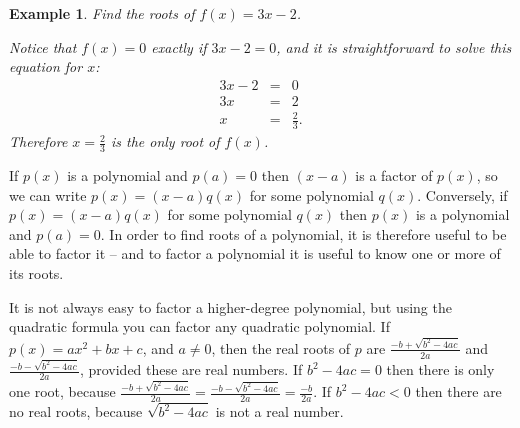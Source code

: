 \documentclass[11pt]{book}               %
\newtheorem{example}{Example}
\begin{document}
\begin{example} Find the roots of $ f(x) = 3x -2 $.

\normalfont
Notice that $f(x)=0$ exactly if $3x-2=0$, and it is straightforward to solve this equation for $x$: 
    \[
    \begin{array}{rcl}
    3x-2 & = & 0\\
    3x  & = & 2\\
    x   & = &  \frac{2}{3} .
    \end{array}
    \]
    Therefore $x = \frac{2}{3}$ is the only root of $f(x)$.
\end{example}


If $p(x)$ is a polynomial and $p(a)=0$ then $(x-a)$ is a factor of $p(x)$, so we can write $p(x) = (x-a)q(x)$ for some polynomial $q(x)$.
Conversely, if $p(x)=(x-a)q(x)$ for some polynomial $q(x)$ then $p(x)$ is a polynomial and $p(a)=0$.
 In order to find roots of a polynomial, it is therefore useful to be able to factor it -- and to factor a polynomial it is useful to know one or more of its roots.


It is not always easy to factor a higher-degree polynomial, but using the quadratic formula you can factor any quadratic polynomial. 
If $p(x) = ax^2 + bx + c$, and $a \neq 0$,  then the real roots of $p$ are $\frac{-b + \sqrt{b^2-4ac}}{2a}$ and $\frac{-b - \sqrt{b^2-4ac}}{2a}$, provided these are real numbers. 
If $b^2-4ac=0$ then there is only one root, because $\frac{-b + \sqrt{b^2-4ac}}{2a}=\frac{-b - \sqrt{b^2-4ac}}{2a}=\frac{-b}{2a}$. If $b^2-4ac<0$ then there are no real roots, because $\sqrt{b^2-4ac}$ is not a real number.
\end{document}
